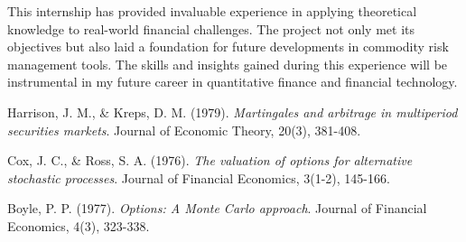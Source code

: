 \documentclass[12pt]{article}
\begin{document}
This internship has provided invaluable experience in applying theoretical knowledge to real-world financial challenges. The project not only met its objectives but also laid a foundation for future developments in commodity risk management tools. The skills and insights gained during this experience will be instrumental in my future career in quantitative finance and financial technology.

\begin{thebibliography}{9}

Harrison, J. M., & Kreps, D. M. (1979).
\textit{Martingales and arbitrage in multiperiod securities markets}.
Journal of Economic Theory, 20(3), 381-408.

Cox, J. C., & Ross, S. A. (1976).
\textit{The valuation of options for alternative stochastic processes}.
Journal of Financial Economics, 3(1-2), 145-166.

Boyle, P. P. (1977).
\textit{Options: A Monte Carlo approach}.
Journal of Financial Economics, 4(3), 323-338.
\end{thebibliography}
\end{document}
